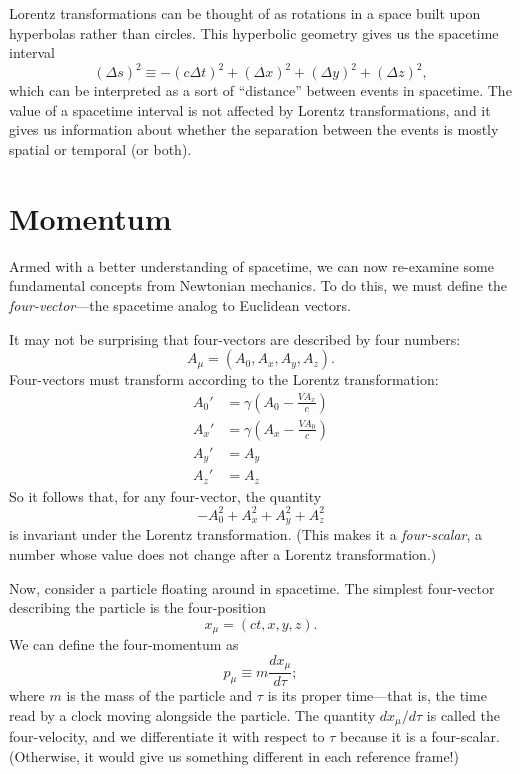 \documentclass[../p023main.tex]{subfiles}
\begin{document}
\begin{summary}
    Lorentz transformations can be thought of as rotations in a space built upon hyperbolas rather than circles.
    This hyperbolic geometry gives us the spacetime interval
    \[ (\Delta s)^2 \equiv -(c \Delta t)^2 + (\Delta x)^2 + (\Delta y)^2 + (\Delta z)^2, \]
    which can be interpreted as a sort of ``distance'' between events in spacetime.
    The value of a spacetime interval is not affected by Lorentz transformations, and it gives us information about whether the separation between the events is mostly spatial or temporal (or both).
\end{summary}


\section{Momentum}
Armed with a better understanding of spacetime, we can now re-examine some fundamental concepts from Newtonian mechanics.
To do this, we must define the \textit{four-vector}---the spacetime analog to Euclidean vectors.

It may not be surprising that four-vectors are described by four numbers:
\[ A_\mu = (A_0, A_x, A_y, A_z). \]
Four-vectors must transform according to the Lorentz transformation:
\begin{align*}
    A_0' &= \gamma \left( A_0 - \frac{VA_x}{c} \right) \\
    A_x' &= \gamma \left( A_x - \frac{VA_0}{c} \right) \\
    A_y' &= A_y \\
    A_z' &= A_z
\end{align*}
So it follows that, for any four-vector, the quantity
\[ -A_0^2 + A_x^2 + A_y^2 + A_z^2 \]
is invariant under the Lorentz transformation.
(This makes it a \textit{four-scalar}, a number whose value does not change after a Lorentz transformation.)

Now, consider a particle floating around in spacetime.
The simplest four-vector describing the particle is the four-position
\[ x_\mu = (ct, x, y, z). \]
We can define the four-momentum as
\[ p_\mu \equiv m \frac{dx_\mu}{d\tau}; \]
where $m$ is the mass of the particle and $\tau$ is its proper time---that is, the time read by a clock moving alongside the particle.
The quantity $dx_\mu / d\tau$ is called the four-velocity, and we differentiate it with respect to $\tau$ because it is a four-scalar.
(Otherwise, it would give us something different in each reference frame!)
\end{document}
